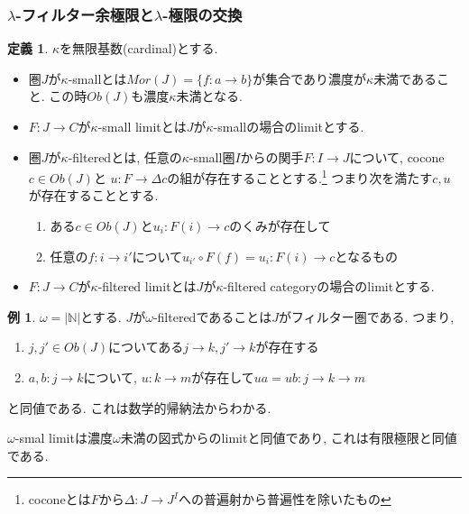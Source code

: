 \documentclass[dvipdfmx,a4paper,11pt]{report}
\newcommand{\N}{\mathbb{N}}
\theoremstyle{definition}
\newtheorem{dfn}[thm]{定義}
\newtheorem{exa}[thm]{例}
\newcommand{\xr}[1]{\textcolor{red}{#1}}
\begin{document}
\subsubsection{$\lambda$-フィルター余極限と$\lambda$-極限の交換}
 \begin{tcolorbox}
 [colback = white, colframe = green!35!black, fonttitle = \bfseries,breakable = true]
 \begin{dfn}\cite{Sha1}
 $\kappa$を無限基数(cardinal)とする.
 \begin{itemize}
 \item 圏$J$が$\kappa$-smallとは$Mor(J) =\{f : a \to b \}$が集合であり濃度が$\kappa$未満であること. この時$Ob(J)$も濃度$\kappa$未満となる.
 \item $F: J\to C$が$\kappa$-small limitとは$J$が$\kappa$-smallの場合のlimitとする.
 \item 圏$J$が$\kappa$-filteredとは, 
  任意の$\kappa$-small圏$I$からの関手$F : I \to J$について, cocone $c \in Ob(J)$と $u: F \to \Delta c$の組が存在することとする.\footnote{coconeとは$F$から$\Delta : J \to J^{I}$への普遍射から普遍性を除いたもの}
つまり次を満たす$c,u$が存在することとする. 
 \begin{enumerate}
 \item ある$c \in Ob(J)$と$u_{i} : F(i) \to c$のくみが存在して
 \item 任意の$f : i \to i'$について$ u_{i'}\circ F(f) = u_{i} : F(i) \to c$となるもの
 \end{enumerate}
\item $F: J\to C$が$\kappa$-filtered limitとは$J$が$\kappa$-filtered categoryの場合のlimitとする.
 \end{itemize}
 \end{dfn}
  \end{tcolorbox}

\begin{exa}
$\omega = |\N|$とする.
$J$が$\omega$-filteredであることは$J$がフィルター圏である. つまり, 
\begin{enumerate}
\item $j, j' \in Ob(J)$についてある$j \to k, j' \to k$が存在する
\item $a, b: j \to k$について, $u: k \to m$が存在して$ua = ub : j \to k \to m$
\end{enumerate}
と同値である.
これは数学的帰納法からわかる.

$\omega$-smal limitは濃度$\omega$未満の図式からのlimitと同値であり, これは有限極限と同値である. 

\end{exa}
\end{document}
